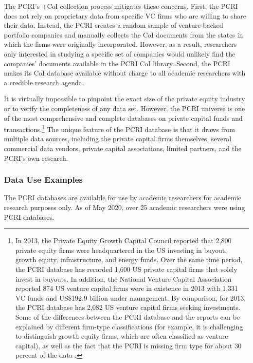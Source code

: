 \documentclass[
]{WileySix}
\begin{document}
The PCRI's +CoI\textbar{} collection process mitigates these concerns. First, the PCRI does not rely on proprietary data from specific VC firms who are willing to share their data. Instead, the PCRI creates a random sample of venture-backed portfolio companies and manually collects the CoI documents from the states in which the firms were originally incorporated. However, as a result, researchers only interested in studying a specific set of companies would unlikely find the companies' documents available in the PCRI CoI library. Second, the PCRI makes its CoI database available without charge to all academic researchers with a credible research agenda.

It is virtually impossible to pinpoint the exact size of the private equity industry or to verify the completeness of any data set. However, the PCRI universe is one of the most comprehensive and complete databases on private capital funds and transactions.\footnote{In 2013, the Private Equity Growth Capital Council \citep{privateequitygrowthcapitalcouncil2013} reported that 2,800 private equity firms were headquartered in the US investing in buyout, growth equity, infrastructure, and energy funds. Over the same time period, the PCRI database has recorded 1,600 US private capital firms that solely invest in buyouts. In addition, the National Venture Capital Association reported 874 US venture capital firms were in existence in 2013 with 1,331 VC funds and US\$192.9 billion under management. By comparison, for 2013, the PCRI database has 2,082 US venture capital firms seeking investments. Some of the differences between the PCRI database and the reports can be explained by different firm-type classifications (for example, it is challenging to distinguish growth equity firms, which are often classified as venture capital), as well as the fact that the PCRI is missing firm type for about 30 percent of the data \citep{jeng2015}.} The unique feature of the PCRI database is that it draws from multiple data sources, including the private capital firms themselves, several commercial data vendors, private capital associations, limited partners, and the PCRI's own research.

\hypertarget{data-use-examples-3}{%
\subsubsection{Data Use Examples}\label{data-use-examples-3}}

The PCRI databases are available for use by academic researchers for academic research purposes only. As of May 2020, over 25 academic researchers were using PCRI databases.
\end{document}
